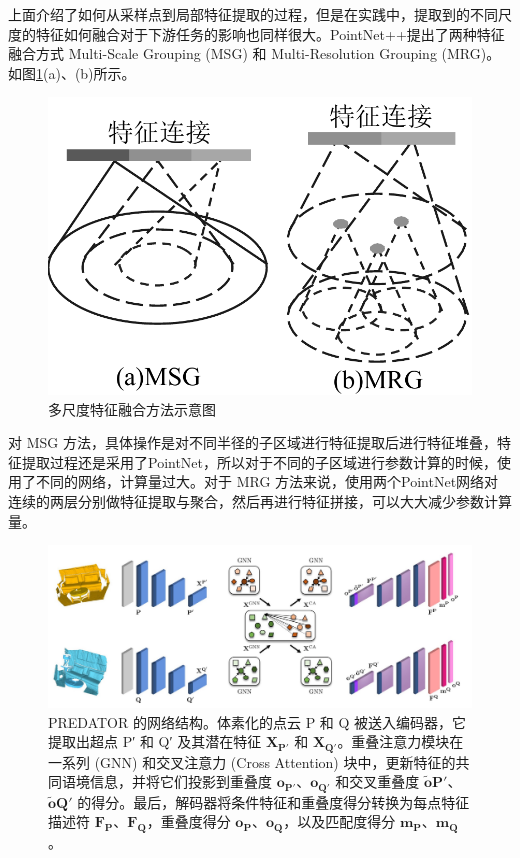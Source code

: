 上面介绍了如何从采样点到局部特征提取的过程，但是在实践中，提取到的不同尺度的特征如何融合对于下游任务的影响也同样很大。PointNet++提出了两种特征融合方式 Multi-Scale Grouping (MSG) 和 Multi-Resolution Grouping (MRG)。如图\ref{fig:pnpp_grouping}(a)、(b)所示。

\begin{figure}
    \vspace{-5mm}
    \centering
    \includegraphics[width=0.45\linewidth]{images/pnpp_group.pdf}
    \caption{多尺度特征融合方法示意图}
    \label{fig:pnpp_grouping}
\end{figure}

对 MSG 方法，具体操作是对不同半径的子区域进行特征提取后进行特征堆叠，特征提取过程还是采用了PointNet，所以对于不同的子区域进行参数计算的时候，使用了不同的网络，计算量过大。对于 MRG 方法来说，使用两个PointNet网络对连续的两层分别做特征提取与聚合，然后再进行特征拼接，可以大大减少参数计算量。

\begin{figure}
    \vspace{-5mm}
    \centering
    \includegraphics[width=\linewidth]{images/PREDATOR.pdf}
    \caption{
        PREDATOR 的网络结构。体素化的点云 P 和 Q 被送入编码器，它提取出超点 P′ 和 Q′ 及其潜在特征 $\boldsymbol{X_{P'}}$ 和 $\boldsymbol{X_{Q'}}$。重叠注意力模块在一系列 (GNN) 和交叉注意力 (Cross Attention) 块中，更新特征的共同语境信息，并将它们投影到重叠度 $\boldsymbol{o_{P'}}$、$\boldsymbol{o_{Q'}}$ 和交叉重叠度 $\boldsymbol{\tilde{o}{P'}}$、$\boldsymbol{\tilde{o}{Q'}}$ 的得分。最后，解码器将条件特征和重叠度得分转换为每点特征描述符 $\boldsymbol{F_{P}}$、$\boldsymbol{F_{Q}}$，重叠度得分 $\boldsymbol{o_{P}}$、$\boldsymbol{o_{Q}}$，以及匹配度得分 $\boldsymbol{m_{P}}$、$\boldsymbol{m_{Q}}$。}
    \label{fig:predator}
    \vspace{-5mm}
\end{figure}

